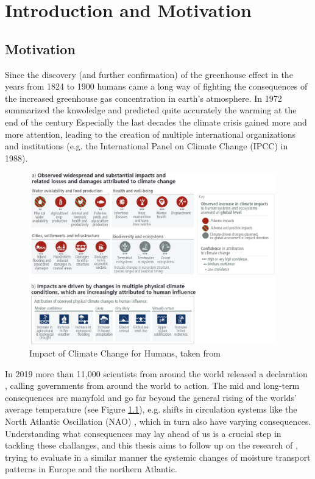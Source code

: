 \chapter{Introduction and Motivation}
\label{ch:intro}


\section{Motivation}
\label{sec:motivation}


Since the discovery (and further confirmation) of the greenhouse effect in the years from 1824 to 1900 \cite{fourier1824remarques, foote1856circumstances} humans came a long way of fighting the consequences of the increased greenhouse gas concentration in earth's atmosphere. 
In 1972 \citeauthor{sawyer1972man} summarized the knwoledge and predicted quite accurately the warming at the end of the century \cite{sawyer1972man}
Especially the last decades the climate crisis gained more and more attention, leading to the creation of multiple international organizations and institutions (e.g. the International Panel on Climate Change (IPCC) in 1988).


\begin{figure}[t]
  \begin{center}
    \includegraphics[width=0.95\textwidth]{figures/ipcc_6th_report_impacts_climate_change.png}
  \end{center}
  \caption{Impact of Climate Change for Humans, taken from \cite{lee2024climate}}
  \label{fig:impacts_climate_change}
\end{figure}



In 2019 more than 11,000  scientists from around the world released a declaration \cite{ripple_world_2019}, calling governments from around the world to action.
The mid and long-term consequences are manyfold and go far beyond the general rising of the worlds' average temperature (see Figure \ref{fig:impacts_climate_change}), e.g. shifts in circulation systems like the North Atlantic Oscillation (NAO) \cite{vietinghoff_visual_2021}, which in turn also have varying consequences. 
Understanding what consequences may lay ahead of us is a crucial step in tackling these challanges, and this thesis aims to follow up on the research of \citeauthor{vietinghoff_visual_2021}, trying to evaluate in a similar manner the systemic changes of moisture transport patterns in Europe and the northern Atlantic. 


